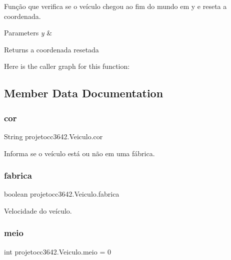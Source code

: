 Função que verifica se o veículo chegou ao fim do mundo em y e reseta a coordenada. 


\begin{DoxyParams}{Parameters}
{\em y} & \\
\hline
\end{DoxyParams}
\begin{DoxyReturn}{Returns}
a coordenada resetada 
\end{DoxyReturn}
Here is the caller graph for this function\+:


\subsection{Member Data Documentation}
\mbox{\label{classprojetocc3642_1_1_veiculo_a00d11c61df9260163eeaa7c3c732f0dc}} 
\subsubsection{cor}
{\footnotesize\ttfamily String projetocc3642.\+Veiculo.\+cor\hspace{0.3cm}{\ttfamily [private]}}



Informa se o veículo está ou não em uma fábrica. 

\mbox{\label{classprojetocc3642_1_1_veiculo_a0befcde7746cec95015bf2ccea39ef56}} 
\subsubsection{fabrica}
{\footnotesize\ttfamily boolean projetocc3642.\+Veiculo.\+fabrica\hspace{0.3cm}{\ttfamily [private]}}



Velocidade do veículo. 

\mbox{\label{classprojetocc3642_1_1_veiculo_aad6c010a26cbdd783edb99d17b021d42}} 
\subsubsection{meio}
{\footnotesize\ttfamily int projetocc3642.\+Veiculo.\+meio = 0\hspace{0.3cm}{\ttfamily [private]}}

